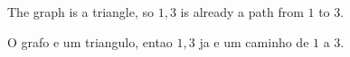 The graph is a triangle, so $1, 3$ is already a path from $1$ to $3$.

O grafo e um triangulo, entao $1, 3$ ja e um caminho de $1$ a $3$.
